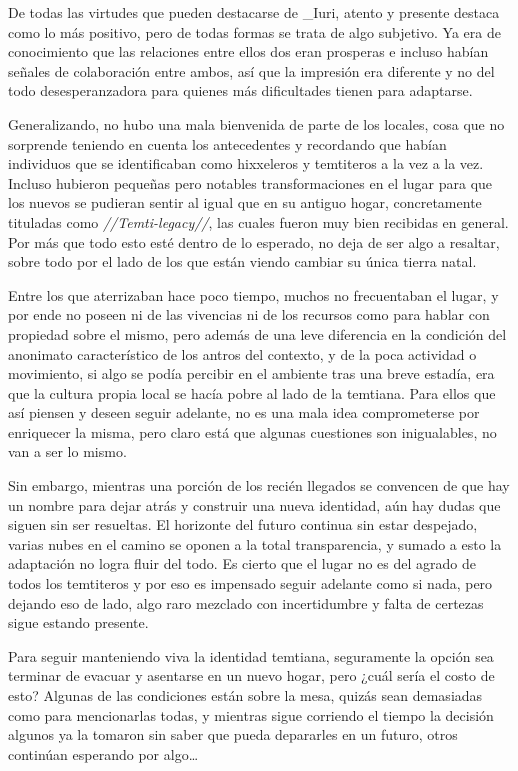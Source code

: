 \documentclass[
  spanish,
]{book}
\begin{document}
De todas las virtudes que pueden destacarse de \_Iuri, atento y presente destaca como lo más positivo, pero de todas formas se trata de algo subjetivo. Ya era de conocimiento que las relaciones entre ellos dos eran prosperas e incluso habían señales de colaboración entre ambos, así que la impresión era diferente y no del todo desesperanzadora para quienes más dificultades tienen para adaptarse.

Generalizando, no hubo una mala bienvenida de parte de los locales, cosa que no sorprende teniendo en cuenta los antecedentes y recordando que habían individuos que se identificaban como hixxeleros y temtiteros a la vez a la vez. Incluso hubieron pequeñas pero notables transformaciones en el lugar para que los nuevos se pudieran sentir al igual que en su antiguo hogar, concretamente tituladas como \emph{//Temti-legacy//}, las cuales fueron muy bien recibidas en general. Por más que todo esto esté dentro de lo esperado, no deja de ser algo a resaltar, sobre todo por el lado de los que están viendo cambiar su única tierra natal.

Entre los que aterrizaban hace poco tiempo, muchos no frecuentaban el lugar, y por ende no poseen ni de las vivencias ni de los recursos como para hablar con propiedad sobre el mismo, pero además de una leve diferencia en la condición del anonimato característico de los antros del contexto, y de la poca actividad o movimiento, si algo se podía percibir en el ambiente tras una breve estadía, era que la cultura propia local se hacía pobre al lado de la temtiana. Para ellos que así piensen y deseen seguir adelante, no es una mala idea comprometerse por enriquecer la misma, pero claro está que algunas cuestiones son inigualables, no van a ser lo mismo.

Sin embargo, mientras una porción de los recién llegados se convencen de que hay un nombre para dejar atrás y construir una nueva identidad, aún hay dudas que siguen sin ser resueltas. El horizonte del futuro continua sin estar despejado, varias nubes en el camino se oponen a la total transparencia, y sumado a esto la adaptación no logra fluir del todo. Es cierto que el lugar no es del agrado de todos los temtiteros y por eso es impensado seguir adelante como si nada, pero dejando eso de lado, algo raro mezclado con incertidumbre y falta de certezas sigue estando presente.

Para seguir manteniendo viva la identidad temtiana, seguramente la opción sea terminar de evacuar y asentarse en un nuevo hogar, pero ¿cuál sería el costo de esto?
Algunas de las condiciones están sobre la mesa, quizás sean demasiadas como para mencionarlas todas, y mientras sigue corriendo el tiempo la decisión algunos ya la tomaron sin saber que pueda depararles en un futuro, otros continúan esperando por algo\ldots{}
\end{document}
